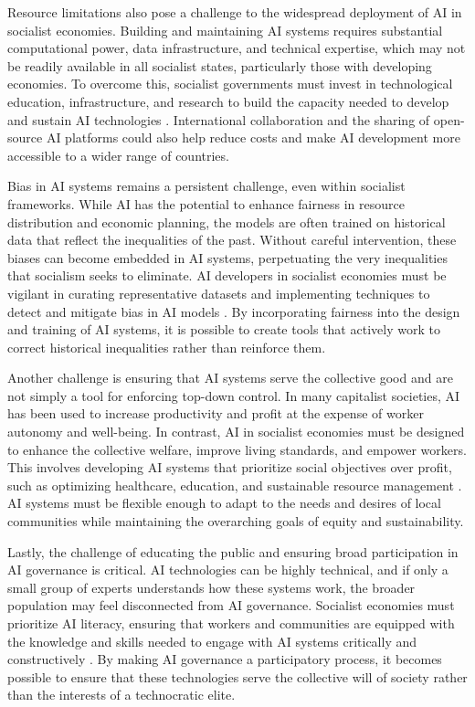 \begin{refsection}
Resource limitations also pose a challenge to the widespread deployment of AI in socialist economies. Building and maintaining AI systems requires substantial computational power, data infrastructure, and technical expertise, which may not be readily available in all socialist states, particularly those with developing economies. To overcome this, socialist governments must invest in technological education, infrastructure, and research to build the capacity needed to develop and sustain AI technologies \cite[pp.~112-115]{schneider2018}. International collaboration and the sharing of open-source AI platforms could also help reduce costs and make AI development more accessible to a wider range of countries.

Bias in AI systems remains a persistent challenge, even within socialist frameworks. While AI has the potential to enhance fairness in resource distribution and economic planning, the models are often trained on historical data that reflect the inequalities of the past. Without careful intervention, these biases can become embedded in AI systems, perpetuating the very inequalities that socialism seeks to eliminate. AI developers in socialist economies must be vigilant in curating representative datasets and implementing techniques to detect and mitigate bias in AI models \cite[pp.~78-81]{treccani2021}. By incorporating fairness into the design and training of AI systems, it is possible to create tools that actively work to correct historical inequalities rather than reinforce them.

Another challenge is ensuring that AI systems serve the collective good and are not simply a tool for enforcing top-down control. In many capitalist societies, AI has been used to increase productivity and profit at the expense of worker autonomy and well-being. In contrast, AI in socialist economies must be designed to enhance the collective welfare, improve living standards, and empower workers. This involves developing AI systems that prioritize social objectives over profit, such as optimizing healthcare, education, and sustainable resource management \cite[pp.~67-70]{brynjolfsson2014}. AI systems must be flexible enough to adapt to the needs and desires of local communities while maintaining the overarching goals of equity and sustainability.

Lastly, the challenge of educating the public and ensuring broad participation in AI governance is critical. AI technologies can be highly technical, and if only a small group of experts understands how these systems work, the broader population may feel disconnected from AI governance. Socialist economies must prioritize AI literacy, ensuring that workers and communities are equipped with the knowledge and skills needed to engage with AI systems critically and constructively \cite[pp.~98-101]{scholz2013}. By making AI governance a participatory process, it becomes possible to ensure that these technologies serve the collective will of society rather than the interests of a technocratic elite.


\end{refsection}
